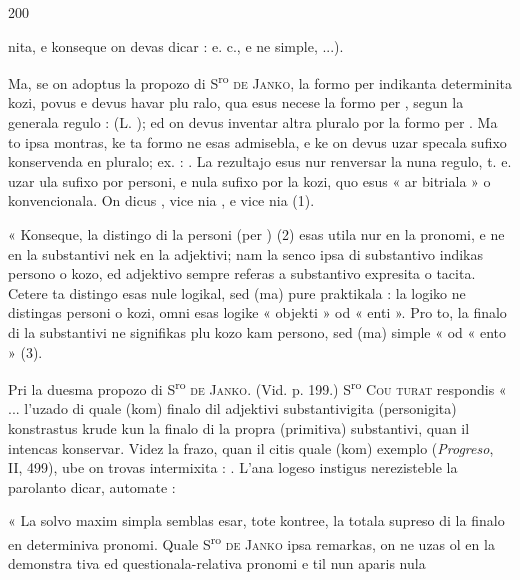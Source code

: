 \begin{VUpage}[204]{200}

\VUcontinue
nita, e konseque on devas dicar : \nl
{} e. c., e ne simple, ...).

Ma, se on adoptus la propozo di S\textsuperscript{ro} \textsc{de Janko}, la formo\nl
per  indikanta determinita kozi, povus e devus havar plu\cc
ralo, qua esus necese la formo per , segun la generala\nl
regulo :  (L. ); ed on devus inventar\nl
altra pluralo por la formo per . Ma to ipsa montras, ke\nl
ta formo ne esas admisebla, e ke on devus uzar specala\nl
sufixo konservenda en pluralo; ex. : . La\nl
rezultajo esus nur renversar la nuna regulo, t. e. uzar ula\nl
sufixo por personi, e nula sufixo por la kozi, quo esus « ar\cc
bitriala » o konvencionala. On dicus , vice\nl
nia , e  vice nia  (1).

« Konseque, la distingo di la personi (per ) (2) esas\nl
utila nur en la pronomi, e ne en la substantivi nek en la\nl
adjektivi; nam la senco ipsa di substantivo indikas persono\nl
o kozo, ed adjektivo sempre referas a substantivo expresita\nl
o tacita. Cetere ta distingo esas nule logikal, sed (ma) pure\nl
praktikala : la logiko ne distingas personi o kozi, omni esas\nl
logike « objekti » od « enti ». Pro to, la finalo  di la\nl
substantivi ne signifikas plu kozo kam persono, sed (ma)\nl
simple «  od « ento » (3).

Pri la duesma propozo di S\textsuperscript{ro} \textsc{de Janko}. (Vid. p. 199.) S\textsuperscript{ro} \textsc{Cou}\cc
\textsc{turat} respondis « ... l'uzado di  quale (kom) finalo dil\nl
adjektivi substantivigita (personigita) konstrastus krude kun\nl
la finalo  di la propra (primitiva) substantivi, quan il\nl
intencas konservar. Videz la frazo, quan il citis quale (kom)\nl
exemplo (\textit{Progreso}, II, 499), ube on trovas intermixita :\nl
{}. L'ana\cc
logeso instigus nerezisteble la parolanto dicar, automate :\nl
{}

« La solvo maxim simpla semblas esar, tote kontree, la\nl
totala supreso di la finalo  en determiniva pronomi. Quale\nl
S\textsuperscript{ro} \textsc{de Janko} ipsa remarkas, on ne uzas ol en la demonstra\cc
tiva ed questionala-relativa pronomi e til nun aparis nula\nl
\end{VUpage}

